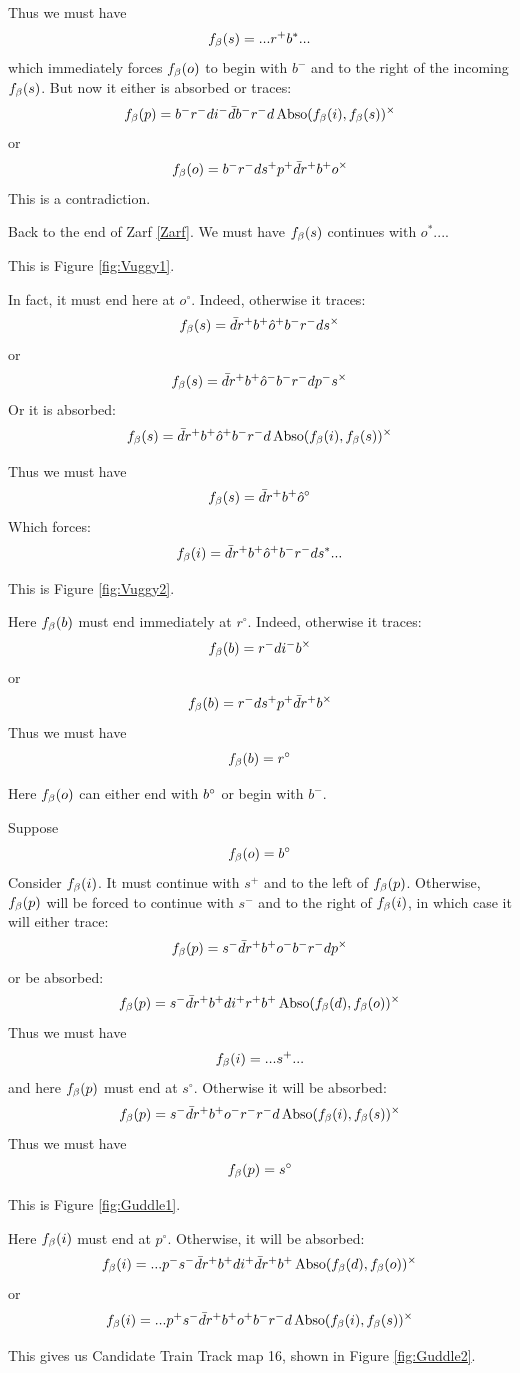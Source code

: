 Thus we must have
\[
f_\beta(s) = ...r^+ b^*...
\]
which immediately forces $f_\beta(o)$ to begin with $b^-$ and to the right of the incoming $f_\beta(s)$. But now it either is absorbed or traces:
\[
f_\beta(p) = b^- r^- d i^- \bar{d} b^- r^- d \operatorname{Abso}(f_\beta(i), f_\beta(s))^\times
\]
or
\[
f_\beta(o) = b^- r^- d s^+ p^+ \bar{d} r^+ b^+ o^\times
\]
This is a contradiction.

\label{Vuggy}
Back to the end of Zarf \ref{Zarf}. We must have $f_\beta(s)$ continues with $o^*...$. 

This is Figure \ref{fig:Vuggy1}.

In fact, it must end here at $o^\circ$. Indeed, otherwise it traces:
\[
f_\beta(s) = \bar{d} r^+ b^+ \hat{o}^+ b^- r^- d s^\times
\]
or
\[
f_\beta(s) = \bar{d} r^+ b^+ \hat{o}^- b^- r^- d p^- s^\times
\]
Or it is absorbed:
\[
f_\beta(s) = \bar{d} r^+ b^+ \hat{o}^+ b^- r^- d \operatorname{Abso}(f_\beta(i), f_\beta(s))^\times
\]

Thus we must have
\[
f_\beta(s) = \bar{d} r^+ b^+ \hat{o}^\circ
\]
Which forces:
\[
f_\beta(i) = \bar{d} r^+ b^+ \hat{o}^+ b^- r^- d s^*...
\]

This is Figure \ref{fig:Vuggy2}.

Here $f_\beta(b)$ must end immediately at $r^\circ$. Indeed, otherwise it traces:
\[
f_\beta(b) = r^- d i^- b^\times
\]
or
\[
f_\beta(b) = r^- d s^+ p^+ \bar{d} r^+ b^\times
\]
Thus we must have
\[
f_\beta(b) = r^\circ
\]

Here $f_\beta(o)$ can either end with $b^\circ$ or begin with $b^-$. 

\label{Guddle}
Suppose 
\[
f_\beta(o) = b^\circ
\]
Consider $f_\beta(i)$. It must continue with $s^+$ and to the left of $f_\beta(p)$. Otherwise, $f_\beta(p)$ will be forced to continue with $s^-$ and to the right of $f_\beta(i)$, in which case it will either trace:
\[
f_\beta(p) = s^- \bar{d} r^+ b^+ o^- b^- r^- d p^\times
\]
or be absorbed:
\[
f_\beta(p) = s^- \bar{d} r^+ b^+ d i^+ r^+ b^+ \operatorname{Abso}(f_\beta(d), f_\beta(o))^\times
\]
Thus we must have
\[
f_\beta(i) = ... s^+...
\]
and here $f_\beta(p)$ must end at $s^\circ$. Otherwise it will be absorbed:
\[
f_\beta(p) = s^- \bar{d} r^+ b^+ o^- r^- r^- d \operatorname{Abso}(f_\beta(i), f_\beta(s))^\times
\]
Thus we must have
\[
f_\beta(p) = s^\circ
\]

This is Figure \ref{fig:Guddle1}.

Here $f_\beta(i)$ must end at $p^\circ$. Otherwise, it will be absorbed:
\[
f_\beta(i) = ...p^- s^- \bar{d} r^+ b^+ d i^+ \bar{d} r^+ b^+ \operatorname{Abso}(f_\beta(d), f_\beta(o))^\times
\]
or
\[
f_\beta(i) = ...p^+ s^- \bar{d} r^+ b^+ o^+ b^- r^- d \operatorname{Abso}(f_\beta(i), f_\beta(s))^\times
\]

This gives us Candidate Train Track map 16, shown in Figure \ref{fig:Guddle2}. 

